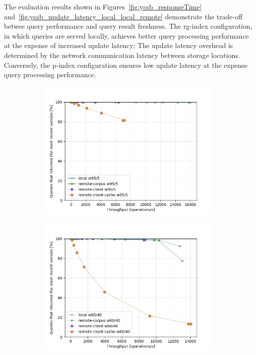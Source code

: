 The evaluation results shown in Figures~\ref{fig:ycsb_responseTime} and~\ref{fig:ycsb_update_latency_local_local_remote} demonstrate the trade-off betwee
query performance and query result freshness.
The rg-index configuration, in which queries are served locally, achieves better query processing performance at the expense of increased update latency;
The update latency overhead is determined by the network communication latency between storage locations.
Conversely, the p-index configuration ensures low update latency at the expense query processing performance.
\begin{figure}[H]
  \begin{subfigure}{0.5\textwidth}
    \includegraphics[width=\linewidth]{./figures/evaluation/ycsb_readV_freshness_throughput_9505.png}
    \caption{}
    \label{fig:ycsb_readV_freshness_throughput_9505}
  \end{subfigure}%
  \hspace*{\fill}
  \begin{subfigure}{0.5\textwidth}
    \includegraphics[width=\linewidth]{./figures/evaluation/ycsb_readV_freshness_throughput_6040.png}

\end{subfigure}
\end{figure}
